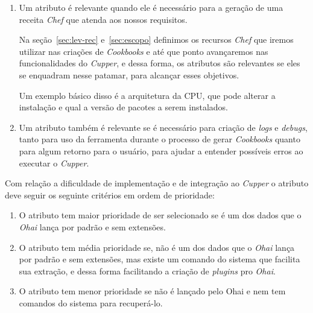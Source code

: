 \begin{enumerate}
\item Um atributo é relevante quando ele é necessário para a geração de uma
receita \textit{Chef} que atenda aos nossos requisitos. 

Na seção~\ref{sec:lev-rec} e~\ref{sec:escopo} definimos os recursos \textit{Chef}
que iremos utilizar nas criações de \textit{Cookbooks} e até que ponto 
avançaremos nas funcionalidades do \textit{Cupper}, e dessa forma, os atributos
são relevantes se eles se enquadram nesse patamar, para alcançar esses objetivos.

Um exemplo básico disso é a arquitetura da CPU, que pode alterar a instalação
e qual a versão de pacotes a serem instalados.

\item Um atributo também é relevante se é necessário para criação de \textit{logs} 
e \textit{debugs}, tanto para uso da ferramenta durante o processo de gerar 
\textit{Cookbooks} quanto para algum retorno para o usuário, para ajudar 
a entender possíveis erros ao executar
o \textit{Cupper}.
\end{enumerate}

Com relação a dificuldade de implementação e de integração ao \textit{Cupper} o
atributo deve seguir os seguinte critérios em ordem de prioridade:

\begin{enumerate}
\item O atributo tem maior prioridade de ser selecionado se é um dos dados 
que o \textit{Ohai} lança por padrão e sem extensões.
\item O atributo tem média prioridade se, não é um dos dados que o \textit{Ohai}
lança por padrão e sem extensões, mas existe um comando do sistema que facilita 
sua extração, e dessa forma facilitando a criação de \textit{plugins} pro 
\textit{Ohai}.
\item O atributo tem menor prioridade se não é lançado pelo Ohai e nem tem 
comandos do sistema para recuperá-lo.
\end{enumerate}



